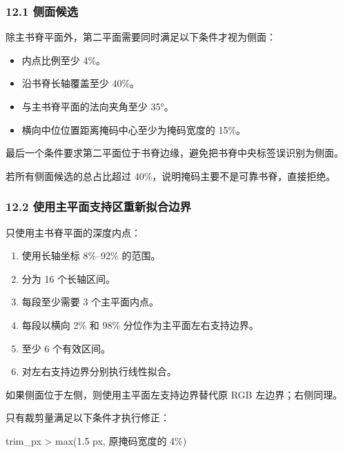 \documentclass[
  chinese,
  11pt,
  a4paper,
]{article}
\newenvironment{Shaded}{\begin{snugshade}}{\end{snugshade}}
\newcommand{\NormalTok}[1]{#1}
\providecommand{\tightlist}{%
  \setlength{\itemsep}{0pt}\setlength{\parskip}{0pt}}
\begin{document}
\subsubsection{12.1 侧面候选}\label{121-ux4fa7ux9762ux5019ux9009}

除主书脊平面外，第二平面需要同时满足以下条件才视为侧面：

\begin{itemize}
\tightlist
\item
  内点比例至少 4\%。
\item
  沿书脊长轴覆盖至少 40\%。
\item
  与主书脊平面的法向夹角至少 35°。
\item
  横向中位位置距离掩码中心至少为掩码宽度的 15\%。
\end{itemize}

最后一个条件要求第二平面位于书脊边缘，避免把书脊中央标签误识别为侧面。

若所有侧面候选的总占比超过 40\%，说明掩码主要不是可靠书脊，直接拒绝。

\subsubsection{12.2
使用主平面支持区重新拟合边界}\label{122-ux4f7fux7528ux4e3bux5e73ux9762ux652fux6301ux533aux91cdux65b0ux62dfux5408ux8fb9ux754c}

只使用主书脊平面的深度内点：

\begin{enumerate}
\def\labelenumi{\arabic{enumi}.}
\tightlist
\item
  使用长轴坐标 8\%--92\% 的范围。
\item
  分为 16 个长轴区间。
\item
  每段至少需要 3 个主平面内点。
\item
  每段以横向 2\% 和 98\% 分位作为主平面左右支持边界。
\item
  至少 6 个有效区间。
\item
  对左右支持边界分别执行线性拟合。
\end{enumerate}

如果侧面位于左侧，则使用主平面左支持边界替代原 RGB 左边界；右侧同理。

只有裁剪量满足以下条件才执行修正：

\begin{Shaded}
\begin{Highlighting}[]
\NormalTok{trim\_px \textgreater{} max(1.5 px, 原掩码宽度的 4\%)}
\end{Highlighting}
\end{Shaded}
\end{document}
